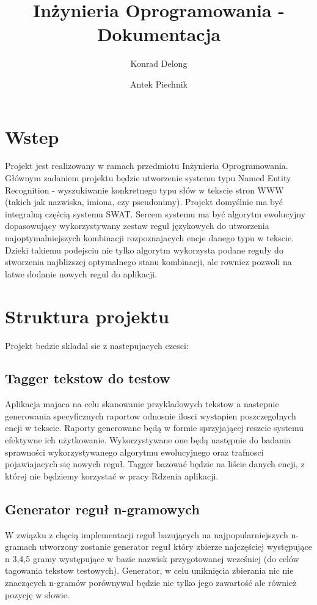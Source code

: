 \documentclass[12pt]{article}
\author{Konrad Delong \and Antek Piechnik}
\title{Inżynieria Oprogramowania - Dokumentacja}
\begin{document}
\maketitle
\tableofcontents
\newpage

\section{Wstep}
Projekt jest realizowany w ramach przedmiotu Inżynieria Oprogramowania. Głównym zadaniem projektu będzie utworzenie systemu typu Named Entity Recognition - wyszukiwanie konkretnego typu słów w tekscie stron WWW (takich jak nazwiska, imiona, czy pseudonimy). Projekt domyślnie ma być integralną częścią systemu SWAT. Sercem systemu ma być algorytm ewolucyjny dopasowujący wykorzystywany zestaw regul językowych do utworzenia najoptymalniejszych kombinacji rozpoznajacych encje danego typu w tekscie. Dzieki takiemu podejsciu nie tylko algorytm wykorzysta podane reguły do stworzenia najbliższej optymalnego stanu kombinacji, ale rowniez pozwoli na latwe dodanie nowych regul do aplikacji.
\section{Struktura projektu}
Projekt bedzie skladal sie z nastepujacych czesci:
\subsection{Tagger tekstow do testow}
Aplikacja majaca na celu skanowanie przykladowych tekstow a nastepnie generowania specyficznych raportow odnosnie ilosci wystapien poszczegolnych encji w tekscie. 
Raporty generowane będą w formie sprzyjającej reszcie systemu efektywne ich użytkowanie. Wykorzystywane one będą następnie do badania sprawności wykorzystywanego algorytmu ewolucyjnego oraz trafnosci pojawiajacych się nowych reguł. 
Tagger bazować będzie na liście danych encji, z której nie będziemy korzystać w pracy Rdzenia aplikacji.
\subsection{Generator reguł n-gramowych}
W związku z chęcią implementacji reguł bazujących na najpopularniejszych n-gramach utworzony zostanie generator reguł który zbierze najczęściej występujące n {3,4,5} gramy występujące w bazie nazwisk przygotowanej wcześniej (do celów tagowania tekstow testowych). Generator, w celu uniknięcia zbierania nic nie znaczących n-gramów porównywał będzie nie tylko jego zawartość ale również pozycję w słowie.
\end{document}
